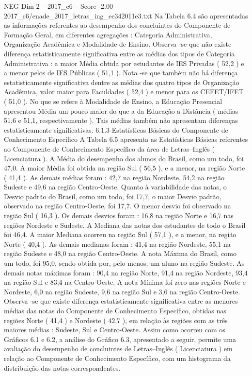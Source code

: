 \begin{textsample}{NEG Dim 2 – 2017\_c6 – Score -2.00 – 2017\_c6/enade\_2017\_letras\_ing\_ee342011e3.txt}
Na Tabela 6.4 são apresentadas as informações referentes ao desempenho dos concluintes do Componente de Formação Geral, em diferentes agregações : Categoria Administrativa, Organização Acadêmica e Modalidade de Ensino.
Observa -se que não existe diferença estatisticamente significativa entre as médias dos tipos de Categoria Administrativa : a maior Média obtida por estudantes de IES Privadas ( 52,2 ) e a menor pelos de IES Públicas ( 51,1 ).
Nota -se que também não há diferença estatisticamente significativa dentre as médias dos quatro tipos de Organização Acadêmica, valor maior para Faculdades ( 52,4 ) e menor para os CEFET/IFET ( 51,0 ).
No que se refere à Modalidade de Ensino, a Educação Presencial apresentou Média um pouco maior do que a da Educação a Distância ( médias 51,6 e 51,1, respectivamente ).
Tais médias também não apresentam diferenças estatisticamente significativas. 6.1.3 Estatísticas Básicas do Componente de Conhecimento Específico A Tabela 6.5 apresenta as Estatísticas Básicas referentes ao Componente de Conhecimento Específico da área de Letras–Inglês ( Licenciatura ).
A Média do desempenho dos alunos do Brasil, como um todo, foi 47,0.
A maior Média foi obtida na região Sul ( 56,5 ), e a menor, na região Norte ( 41,4 ).
As demais médias foram : 42,7 na região Nordeste, 54,2 na região Sudeste e 49,6 na região Centro-Oeste.
Quanto à variabilidade das notas, o Desvio padrão do Brasil, como um todo, foi 17,7, o maior Desvio padrão, observado na região Centro-Oeste, foi 17,7.
O menor desvio foi observado na região Sul ( 16,3 ).
Os demais desvios foram : 16,8 na região Norte e 16,7 nas regiões Nordeste e Sudeste.
A Mediana das notas dos estudantes de todo o Brasil foi 46,4.
A maior Mediana ocorreu na região Sul ( 57,1 ), e a menor, na região Norte ( 40,4 ).
As demais medianas foram : 41,4 na região Nordeste, 55,1 na região Sudeste e 48,0 na região Centro-Oeste.
A nota Máxima do Brasil, como um todo, foi 95,0, sendo obtida por, pelo menos, um aluno na região Sudeste.
As demais notas máximas foram : 90,4 na região Norte, 91,4 na região Nordeste, 93,4 na região Sul e 83,4 na Centro-Oeste.
A nota Mínima foi zero nas regiões Norte e Nordeste, 6,0 na região Sudeste, 9,6 na região Sul e 3,6 na região Centro-Oeste.
Observa -se que existe diferença estatisticamente significativa entre as menores médias das notas do Componente de Conhecimento Específico, obtidas nas regiões Norte ( 41,4 ) e Nordeste ( 42,7 ), em relação às regiões com as três maiores médias : Sudeste, Sul e Centro-Oeste.
Assim como ocorreu com os Gráficos 6.1 e 6.2, a análise do Gráfico 6.3, apresentado a seguir, permite uma avaliação do desempenho de concluintes de Letras–Inglês ( Licenciatura ) em relação ao Componente de Conhecimento Específico, com um histograma da distribuição das notas correspondentes.

\end{textsample}
